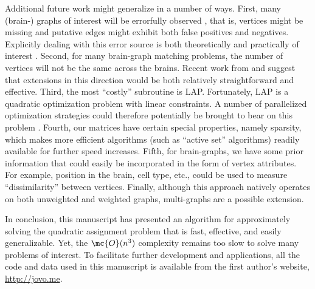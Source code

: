\documentclass[11pt]{article}
\begin{document}
Additional future work might generalize \FAQ in a number of ways.  First, many (brain-) graphs of interest will be errorfully observed \cite{Priebe2011}, that is, vertices might be missing and putative edges might exhibit both false positives and negatives.  Explicitly dealing with this error source is both theoretically and practically of interest \cite{VP11_unlabeled}.  
Second, for many brain-graph matching problems, the number of vertices will not be the same across the brains.  Recent work from \cite{Zaslavskiy2009, Zaslavskiy2010} and \cite{Escolano2011} suggest that extensions in this direction would be both relatively straightforward and effective. Third, the most ``costly'' subroutine is LAP.  Fortunately, LAP is a quadratic optimization problem with linear constraints.  A number of parallelized optimization strategies could therefore potentially be brought to bear on this problem \cite{Boyd2011}.  Fourth, our matrices have certain special properties, namely sparsity, which makes more efficient algorithms (such as ``active set'' algorithms) readily available for further speed increases.  Fifth, for brain-graphs, we have some prior information that could easily be incorporated in the form of vertex attributes.  For example, position in the brain, cell type, etc., could be used to measure ``dissimilarity'' between vertices.  %
Finally, although this approach natively operates on both unweighted and weighted graphs, multi-graphs are a possible extension.

In conclusion, this manuscript has presented an algorithm for approximately solving the quadratic assignment problem that is fast, effective, and easily generalizable.  Yet, the $\mc{O}(n^3)$ complexity remains too slow to solve many problems of interest.  To facilitate further development and applications, all the code and data used in this manuscript is available from the first author's website, \url{http://jovo.me}.
\end{document}
